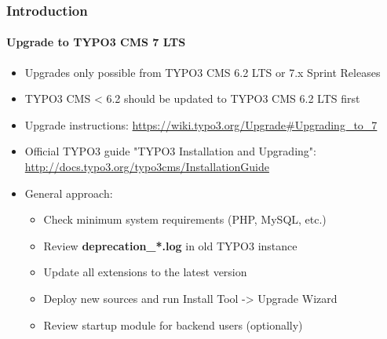 \begin{frame}[fragile]
	\frametitle{Introduction}
	\framesubtitle{Upgrade to TYPO3 CMS 7 LTS}

	\begin{itemize}
		\item Upgrades only possible from TYPO3 CMS 6.2 LTS or 7.x Sprint Releases
		\item TYPO3 CMS < 6.2 should be updated to TYPO3 CMS 6.2 LTS first
	\end{itemize}

	\begin{itemize}

		\item Upgrade instructions:\newline
			\smaller\url{https://wiki.typo3.org/Upgrade#Upgrading_to_7}\normalsize
		\item Official TYPO3 guide "TYPO3 Installation and Upgrading":
			\smaller\url{http://docs.typo3.org/typo3cms/InstallationGuide}\normalsize
		\item General approach:
			\begin{itemize}
				\item Check minimum system requirements \small(PHP, MySQL, etc.)
				\item Review \textbf{deprecation\_*.log} in old TYPO3 instance
				\item Update all extensions to the latest version
				\item Deploy new sources and run Install Tool -> Upgrade Wizard
				\item Review startup module for backend users (optionally)
			\end{itemize}
	\end{itemize}

\end{frame}

